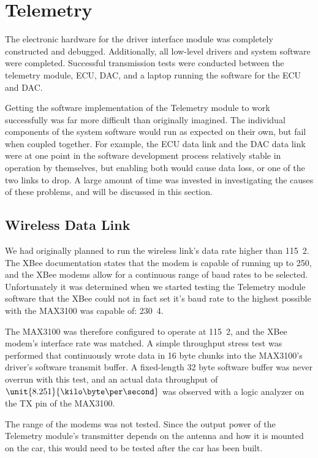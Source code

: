 \section{Telemetry}

The electronic hardware for the driver interface module was completely constructed and debugged. Additionally, all low-level drivers and system software were completed. Successful transmission tests were conducted between the telemetry module, ECU, DAC, and a laptop running the software for the ECU and DAC.

Getting the software implementation of the Telemetry module to work successfully was far more difficult than originally imagined. The individual components of the system software would run as expected on their own, but fail when coupled together. For example, the ECU data link and the DAC data link were at one point in the software development process relatively stable in operation by themselves, but enabling both would cause data loss, or one of the two links to drop. A large amount of time was invested in investigating the causes of these problems, and will be discussed in this section.

\subsection{Wireless Data Link}

We had originally planned to run the wireless link's data rate higher than \unit{115.2}{\kilo\bit\per\second}. The XBee documentation states that the modem is capable of running up to \unit{250}{\kilo\bit\per\second}, and the XBee modems allow for a continuous range of baud rates to be selected. Unfortunately it was determined when we started testing the Telemetry module software that the XBee could not in fact set it's baud rate to the highest possible with the MAX3100 was capable of: \unit{230.4}{\kilo\bit\per\second}.

The MAX3100 was therefore configured to operate at \unit{115.2}{\kilo\bit\per\second}, and the XBee modem's interface rate was matched. A simple throughput stress test was performed that continuously wrote data in 16 byte chunks into the MAX3100's driver's software transmit buffer. A fixed-length 32 byte software buffer was never overrun with this test, and an actual data throughput of $\unit{8.251}{\kilo\byte\per\second}$ was observed with a logic analyzer on the TX pin of the MAX3100.

The range of the modems was not tested. Since the output power of the Telemetry module's transmitter depends on the antenna and how it is mounted on the car, this would need to be tested after the car has been built.

